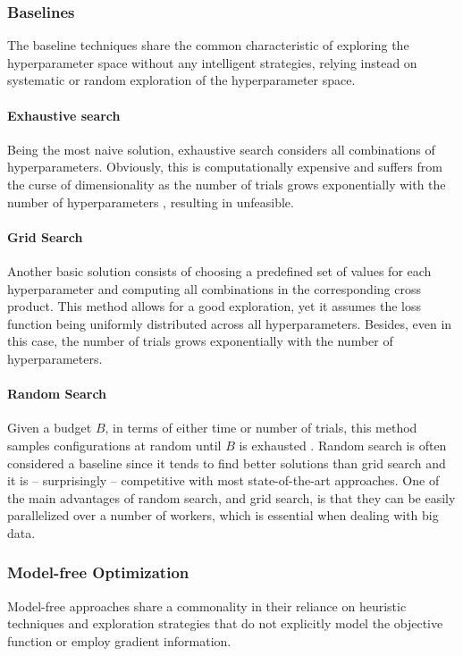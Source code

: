 \subsubsection{Baselines}
The baseline techniques share the common characteristic of exploring the hyperparameter space without any intelligent strategies, relying instead on systematic or random exploration of the hyperparameter space.

\paragraph{Exhaustive search}
Being the most naive solution, exhaustive search considers all combinations of hyperparameters.
Obviously, this is computationally expensive and suffers from the curse of dimensionality as the number of trials grows exponentially with the number of hyperparameters \cite{7}, resulting in unfeasible.

\paragraph{Grid Search}
Another basic solution consists of choosing a predefined set of values for each hyperparameter and computing all combinations in the corresponding cross product.
This method allows for a good exploration, yet it assumes the loss function being uniformly distributed across all hyperparameters.
Besides, even in this case, the number of trials grows exponentially with the number of hyperparameters.

\paragraph{Random Search}
Given a budget $B$, in terms of either time or number of trials, this method samples configurations at random until $B$ is exhausted \cite{10}.
Random search is often considered a baseline since it tends to find better solutions than grid search \cite{90} and it is -- surprisingly -- competitive with most state-of-the-art approaches.
One of the main advantages of random search, and grid search, is that they can be easily parallelized over a number of workers, which is essential when dealing with big data.

\subsubsection{Model-free Optimization}
Model-free approaches share a commonality in their reliance on heuristic techniques and exploration strategies that do not explicitly model the objective function or employ gradient information.

